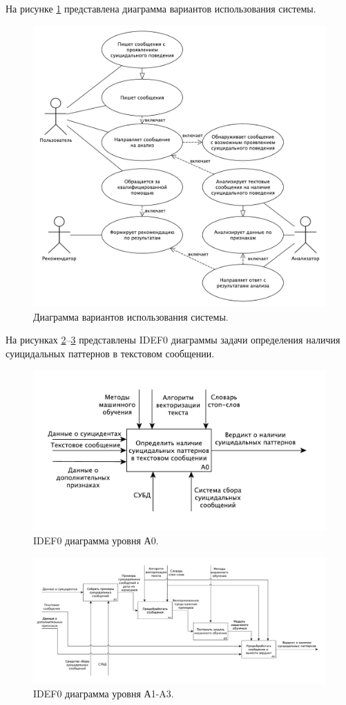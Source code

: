На рисунке \ref{img:useCase} представлена диаграмма вариантов использования системы.

\begin{figure}[H]
	\centering
	\includegraphics[width=\textwidth]{inc/useCase.pdf}
	\caption{ Диаграмма вариантов использования системы. }
	\label{img:useCase}
\end{figure}

На рисунках \ref{img:idef0}--\ref{img:idef1} представлены IDEF0 диаграммы задачи определения наличия суицидальных паттернов в текстовом сообщении.


\begin{figure}[H]
	\centering
	\includegraphics[width=\textwidth]{inc/A0.pdf}
	\caption{ IDEF0 диаграмма уровня А0. }
	\label{img:idef0}
\end{figure}

\begin{figure}[H]
	\centering
	\includegraphics[width=\textwidth]{inc/A1.pdf}
	\caption{ IDEF0 диаграмма уровня А1-A3. }
	\label{img:idef1}
\end{figure}

\pagebreak
